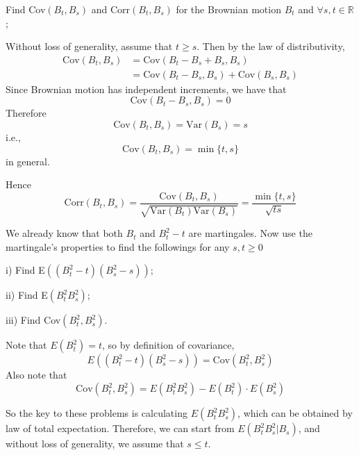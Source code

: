 \newcommand{\Cov}{\mathrm{Cov}}
\newcommand{\Var}{\mathrm{Var}}
\newcommand{\Corr}{\mathrm{Corr}}

    \problem
    \begin{question}
        Find Cov$(B_t,B_s)$ and  Corr$(B_t,B_s)$ for the Brownian motion
        $B_t$ and $\forall s,t\in\mathbb R$;
    \end{question}

    Without loss of generality, assume that $t\geq s$.
    Then by the law of distributivity,
    \begin{align*}
        \Cov(B_t,B_s)&=\Cov(B_t-B_s+B_s,B_s)\\
                     &=\Cov(B_t-B_s,B_s)+\Cov(B_s,B_s)
    \end{align*} 
    Since Brownian motion has independent increments,
    we have that
    \[\Cov(B_t-B_s,B_s)=0\]
    Therefore
    \[\Cov(B_t,B_s)=\Var(B_s)=s\]
    i.e.,
    \[\Cov(B_t,B_s)=\min\{t,s\}\]
    in general.

    Hence
    \[\Corr(B_t,B_s)=\frac{\Cov(B_t,B_s)}{\sqrt{\Var(B_t)\Var(B_s)}}
    =\frac{\min\{t,s\}}{\sqrt{ts}}\]

    \problem
    \begin{question}
        We already know that both $B_t$ and $B^2_t-t$ are martingales. 
        Now use the martingale's properties to find the followings for any $s,t\geq0$

        \noindent i)  Find E$((B^2_t-t)(B^2_s-s))$;

        \noindent ii)  Find E$(B^2_tB^2_s)$;

        \noindent iii)  Find Cov$(B^2_t,B^2_s)$.
    \end{question}

    Note that $E\left(B_t^2\right)=t$, so by definition of
    covariance,
    \begin{equation}
        \label{eq:cov def}
        E\left((B_t^2-t)(B_s^2-s)\right)=\Cov(B_t^2,B_s^2)
    \end{equation}
    Also note that
    \begin{equation}
        \label{eq:cov formula}
        \Cov(B_t^2,B_s^2)=E(B_t^2B_s^2)-E(B_t^2)\cdot E(B_s^2)
    \end{equation}

    So the key to these problems is calculating $E(B_t^2B_s^2)$,
    which can be obtained by law of total expectation. Therefore,
    we can start from $E(B_t^2B_s^2|B_s)$, and without
    loss of generality, we assume that $s\leq t$.

